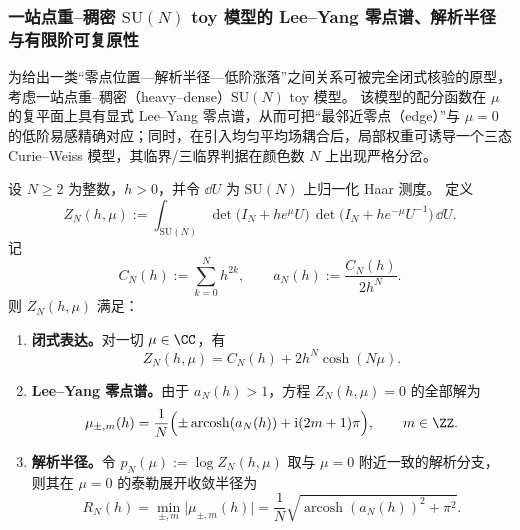 \subsubsection{一站点重--稠密 \texorpdfstring{$\mathrm{SU}(N)$}{SU(N)} toy 模型的 Lee--Yang 零点谱、解析半径与有限阶可复原性}\label{subsubsec:xi-hdqcd1-leyang-radius-susceptibility-cw}
为给出一类“零点位置—解析半径—低阶涨落”之间关系可被完全闭式核验的原型，考虑一站点重--稠密（heavy--dense）\(\mathrm{SU}(N)\) toy 模型。
该模型的配分函数在 \(\mu\) 的复平面上具有显式 Lee--Yang 零点谱，从而可把“最邻近零点（edge）”与 \(\mu=0\) 的低阶易感精确对应；同时，在引入均匀平均场耦合后，局部权重可诱导一个三态 Curie--Weiss 模型，其临界/三临界判据在颜色数 \(N\) 上出现严格分岔。

\begin{theorem}[HDQCD\(_1\)：Lee--Yang 零点谱与 \(\mu=0\) 的泰勒解析半径闭式]\label{thm:xi-hdqcd1-leyang-spectrum-radius}
设 \(N\ge 2\) 为整数，\(h>0\)，并令 \(\dd U\) 为 \(\mathrm{SU}(N)\) 上归一化 Haar 测度。
定义
\begin{equation}\label{eq:xi-hdqcd1-partition-function}
Z_N(h,\mu)
:=
\int_{\mathrm{SU}(N)}
\det\!\bigl(I_N+h e^{\mu}U\bigr)\,
\det\!\bigl(I_N+h e^{-\mu}U^{-1}\bigr)\,
\dd U.
\end{equation}
记
\begin{equation}\label{eq:xi-hdqcd1-CN-aN}
C_N(h):=\sum_{k=0}^{N}h^{2k},
\qquad
a_N(h):=\frac{C_N(h)}{2h^{N}}.
\end{equation}
则 \(Z_N(h,\mu)\) 满足：
\begin{enumerate}
  \item \textbf{闭式表达。}对一切 \(\mu\in\CC\)，有
  \begin{equation}\label{eq:xi-hdqcd1-closed-form}
  Z_N(h,\mu)=C_N(h)+2h^{N}\cosh(N\mu).
  \end{equation}
  \item \textbf{Lee--Yang 零点谱。}由于 \(a_N(h)>1\)，方程 \(Z_N(h,\mu)=0\) 的全部解为
  \begin{equation}\label{eq:xi-hdqcd1-zeros}
  \mu_{\pm,m}(h)=\frac{1}{N}\Bigl(\pm \operatorname{arcosh}(a_N(h))+\mathrm{i}(2m+1)\pi\Bigr),
  \qquad m\in\ZZ.
  \end{equation}
  \item \textbf{解析半径。}令 \(p_N(\mu):=\log Z_N(h,\mu)\) 取与 \(\mu=0\) 附近一致的解析分支，则其在 \(\mu=0\) 的泰勒展开收敛半径为
  \begin{equation}\label{eq:xi-hdqcd1-radius}
  R_N(h)=\min_{\pm,m}\bigl|\mu_{\pm,m}(h)\bigr|
  =\frac{1}{N}\sqrt{\operatorname{arcosh}(a_N(h))^{2}+\pi^{2}}.
  \end{equation}
\end{enumerate}
\end{theorem}

